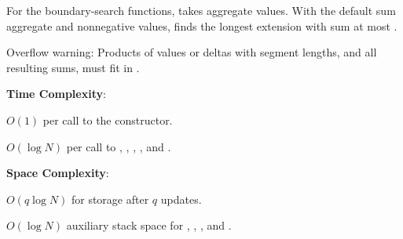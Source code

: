 For the boundary-search functions,  takes aggregate  values. With the default sum aggregate and nonnegative values,  finds the longest extension with sum at most .

Overflow warning: Products of values or deltas with segment lengths, and all resulting sums, must fit in .

\textbf{Time Complexity}:
\begin{compactitem}
  \item $O(1)$ per call to the constructor.
  \item $O(\log N)$ per call to , , , , and .
\end{compactitem}

\textbf{Space Complexity}:
\begin{compactitem}
  \item $O(q \log N)$ for storage after $q$ updates.
  \item $O(\log N)$ auxiliary stack space for , , , and .
\end{compactitem}

